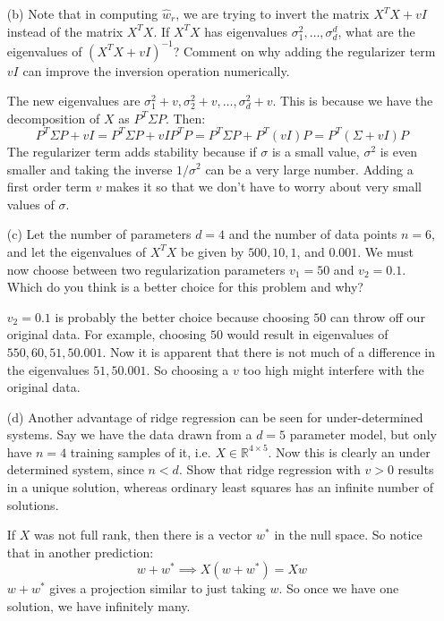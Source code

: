 \documentclass{article}
\begin{document}
\begin{itemize}
        \item [(b)] Note that in computing $\hat{w}_{r}$, we are trying to invert the matrix $X^{T}X + vI$ instead of the matrix $X^{T}X$. If $X^{T}X$ has eigenvalues $\sigma_{1}^{2}, \ldots, \sigma_{d}^{d}$, what are the eigenvalues of $(X^{T}X + vI)^{-1}$? Comment on why adding the regularizer term $vI$ can improve the inversion operation numerically.
            \begin{answer}
                The new eigenvalues are $\sigma_{1}^{2} + v, \sigma_{2}^{2} + v, \ldots, \sigma_{d}^{2} + v$. This is because we have the decomposition of $X$ as $P^{T}\Sigma P$. Then:
                    \begin{equation*}
                        P^{T}\Sigma P + vI = P^{T}\Sigma P + vI P^{T}P = P^{T}\Sigma P + P^{T}(vI)P = P^{T}(\Sigma +  vI) P
                    \end{equation*}
                The regularizer term adds stability because if $\sigma$ is a small value, $\sigma^{2}$ is even smaller and taking the inverse $1/\sigma^{2}$ can be a very large number. Adding a first order term $v$ makes it so that we don't have to worry about very small values of $\sigma$.
            \end{answer}

        \item [(c)] Let the number of parameters $d = 4$ and the number of data points $n = 6$, and let the eigenvalues of $X^{T}X$ be given by $500, 10, 1$, and $0.001$. We must now choose between two regularization parameters $v_{1} = 50$ and $v_{2} = 0.1$. Which do you think is a better choice for this problem and why?
            \begin{answer}
                $v_{2} = 0.1$ is probably the better choice because choosing $50$ can throw off our original data. For example, choosing $50$ would result in eigenvalues of $550, 60, 51, 50.001$. Now it is apparent that there is not much of a difference in the eigenvalues $51, 50.001$. So choosing a $v$ too high might interfere with the original data.
            \end{answer}

        \item [(d)] Another advantage of ridge regression can be seen for under-determined systems. Say we have the data drawn from a $d = 5$ parameter model, but only have $n = 4$ training samples of it, i.e. $X \in \mathbb{R}^{4 \times 5}$. Now this is clearly an under determined system, since $n < d$. Show that ridge regression with $v > 0$ results in a unique solution, whereas ordinary least squares has an infinite number of solutions.
            \begin{answer}
                If $X$ was not full rank, then there is a vector $w^{*}$ in the null space. So notice that in another prediction:
                    \begin{equation*}
                        w + w^{*} \implies X(w + w^{*}) = Xw
                    \end{equation*}
                $w + w^{*}$ gives a projection similar to just taking $w$. So once we have one solution, we have infinitely many.


\end{answer}
\end{itemize}
\end{document}
